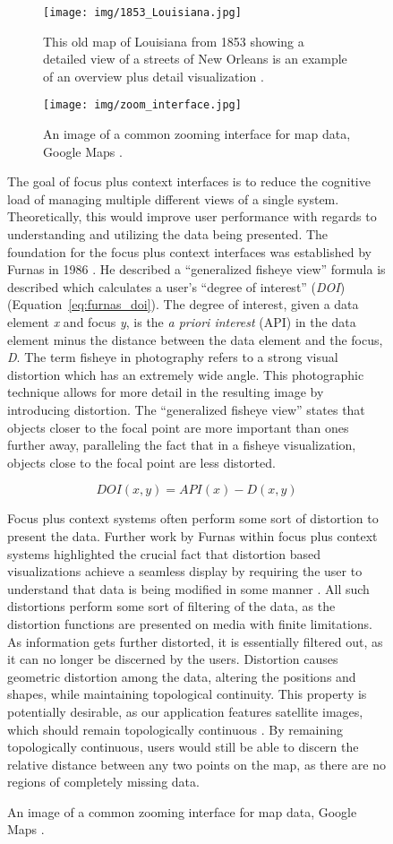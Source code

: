 \begin{figure}[htp]
{\begin{figure}[htp] \centering
    \texttt{[image: img/1853\_Louisiana.jpg]}
    \caption[Overview Plus Detail]{This old map of Louisiana from 1853 showing a detailed view of a streets of New Orleans is an example of an overview plus detail visualization \cite{Mitchell1853}.}
    \label{fig:louisiana}
\end{figure}

\begin{figure}[htp] \centering
    \texttt{[image: img/zoom\_interface.jpg]}
    \caption[Zooming Interface]{An image of a common zooming interface for map data, Google Maps \cite{google_maps}.}
    \label{fig:google_maps}
\end{figure}

The goal of focus plus context interfaces is to reduce the cognitive load of managing multiple different views 
of a single system. Theoretically, this would improve user performance with regards to understanding and 
utilizing the data being presented. The foundation for the focus plus context interfaces was established by Furnas in 1986
\cite{Furnas1986}. He described a ``generalized fisheye view'' formula is described which 
calculates a user's ``degree of interest'' (\emph{DOI}) \cite{Furnas1986} (Equation~\ref{eq:furnas_doi}). The degree of interest, given a data element \emph{x} and focus \emph{y}, is the \emph{a priori interest} (API) in the data element minus the distance between the data element and the focus, \emph{D}.  The term fisheye in photography refers to a strong visual distortion which has an extremely wide angle. This photographic technique allows for more detail
in the resulting image by introducing distortion. The ``generalized fisheye view'' states that objects closer to the focal point are more important than ones further away, paralleling the fact that in a fisheye visualization, objects close to the focal point are less distorted.

\begin{equation}
    \label{eq:furnas_doi} 
    DOI(x, y) = API(x) - D(x,y)
\end{equation}

Focus plus context systems often perform some sort of distortion to present the data. Further work by Furnas within focus plus context systems highlighted the crucial fact that distortion based visualizations achieve a seamless display by requiring the user to understand that data is being modified in some manner \cite{Furnas2006}. All such distortions perform some sort of filtering of the data, as the distortion functions are presented on media with finite limitations. As information
gets further distorted, it is essentially filtered out, as it can no longer be discerned by the users. Distortion causes geometric distortion among the data, altering the positions and shapes, while maintaining topological continuity. This property is potentially desirable, as our application features satellite images, which should remain topologically continuous \cite{Furnas2006}. By remaining topologically continuous, users would still be able to discern the
relative distance between any two points on the map, as there are no regions of completely missing data.

}
\end{figure}
